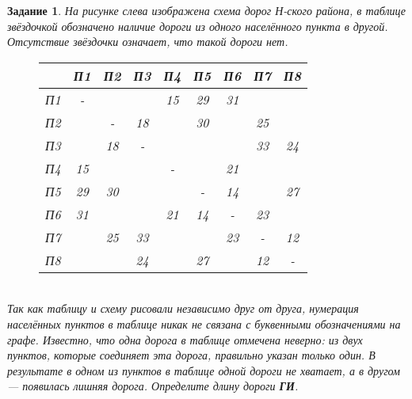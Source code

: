 \documentclass[12pt]{article}
\theoremstyle{problem_style}
\newtheorem{problem}{Задание}[subsection]
\begin{document}
\begin{problem}
На рисунке слева изображена схема дорог Н-ского района, в таблице звёздочкой обозначено наличие дороги из одного населённого пункта в другой. Отсутствие звёздочки означает, что такой дороги нет.
\begin{figure}[h]
    \centering
    \begin{minipage}[t!]{0.45\textwidth}
        \centering
        \begin{tabular}{|c|c|c|c|c|c|c|c|c|} \hline
        & П1 & П2 & П3 & П4 & П5 & П6 & П7 & П8 \\ \hline
        П1 & - &  &  & 15 & 29 & 31 &  &  \\ \hline
        П2 &  & - & 18 &  & 30 &  & 25 &  \\ \hline
        П3 &  & 18 & - &  &  &  & 33 & 24 \\ \hline
        П4 & 15 &  &  & - &  & 21 &  &  \\ \hline
        П5 & 29 & 30 &  &  & - & 14 &  & 27 \\ \hline
        П6 & 31 &  &  & 21 & 14 & - & 23 &  \\ \hline
        П7 &  & 25 & 33 &  &  & 23 & - & 12 \\ \hline
        П8 &  &  & 24 &  & 27 &  & 12 & - \\ \hline
        \end{tabular}
    \end{minipage}
    \hfill
    \begin{minipage}[t!]{0.45\textwidth}
        \centering
    \end{minipage}
\end{figure}\\
Так как таблицу и схему рисовали независимо друг от друга, нумерация населённых пунктов в таблице никак не связана с буквенными обозначениями на графе. Известно, что одна дорога в таблице отмечена неверно: из двух пунктов, которые соединяет эта дорога, правильно указан только один. В результате в одном из пунктов в таблице одной дороги не хватает, а в другом — появилась лишняя дорога. Определите длину дороги \textbf{ГИ}.\\

\end{problem}
\end{document}
